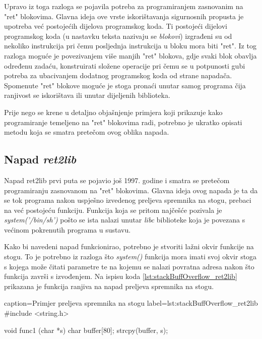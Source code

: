 \documentclass[times, utf8, diplomski, numeric]{fer}
\begin{document}
Upravo iz toga razloga se pojavila potreba za programiranjem
zasnovanim na "ret" blokovima. Glavna ideja ove vrste
iskorištavanja sigurnosnih propusta je upotreba već postojećih
dijelova programskog koda. Ti postojeći dijelovi programskog koda 
(u nastavku teksta nazivaju se \emph{blokovi}) izgrađeni su od
nekoliko instrukcija pri čemu posljednja instrukcija u bloku mora
biti "ret". Iz tog razloga moguće je povezivanjem više manjih
"ret" blokova, gdje svaki blok obavlja određenu zadaću,
konstruirati složene operacije pri čemu se u potpunosti gubi
potreba za ubacivanjem dodatnog programskog koda od strane napadača. Spomenute
"ret" blokove moguće je stoga pronaći unutar samog programa čija
ranjivost se iskorištava ili unutar dijeljenih biblioteka.

Prije nego se krene u detaljno objašnjenje primjera koji
prikazuje kako programiranje temeljeno na "ret" blokovima radi,
potrebno je ukratko opisati metodu koja se smatra pretečom ovog
oblika napada.

\subsection{Napad \emph{ret2lib}}

Napad ret2lib prvi puta se pojavio još 1997. godine 
\citep{ret2lib_official} i smatra se pretečom programiranju
zasnovanom na "ret" blokovima. Glavna ideja ovog napada je ta da
se tok programa nakon uspješno izvedenog preljeva spremnika na
stogu, prebaci na već postojeću funkciju. Funkcija koja se pritom
najčešće pozivala je \emph{system('/bin/sh')} pošto se ista
nalazi unutar \emph{libc} biblioteke koja je povezana s većinom
pokrenutih programa u sustavu.

Kako bi navedeni napad funkcionirao, potrebno je stvoriti lažni
okvir funkcije na stogu. To je potrebno iz razloga što
\emph{system()} funkcija mora imati svoj okvir stoga s kojega
može čitati parametre te na kojemu se nalazi povratna adresa
nakon što funkcija završi s izvođenjem. Na ispisu  koda 
\ref{lst:stackBuffOverflow_ret2lib} prikazana je funkcija ranjiva
na napad preljeva spremnika na stogu.

\begin{ispis} {caption=Primjer preljeva spremnika na stogu} {label=lst:stackBuffOverflow_ret2lib}
#include <string.h>
 
void func1 (char *s)
{
	char buffer[80];
	strcpy(buffer, s);
}

\end{ispis}
\end{document}
